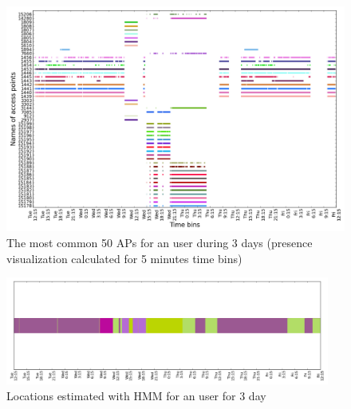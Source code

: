 \begin{figure}[!h] \centering
\includegraphics[width=\textwidth]{figures/hmm/user_6_sorted_3days_no_rssi_plot.png}
\caption{The most common 50 APs for an user during 3 days (presence
visualization calculated for 5 minutes time bins)}
\label{user_6_days1_to_3_APs_presence}
\end{figure}

\begin{figure}[!h]
\centering
\includegraphics[width=0.95\textwidth]{figures/hmm/hmm_locations_(5)_3days_plot.png}
\caption{Locations estimated with HMM for an user for 3 day}
\label{user_6_days1_to_3_hmm}
\end{figure}